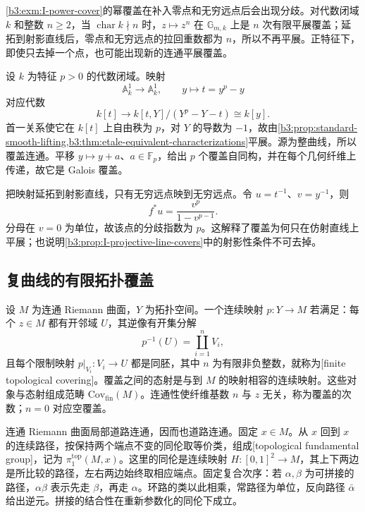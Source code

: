 \cref{b3:exm:I-power-cover}的幂覆盖在补入零点和无穷远点后会出现分歧。对代数闭域 \(k\) 和整数 \(n\ge2\)，当 \(\operatorname{char}k\nmid n\) 时，\(z\mapsto z^n\) 在 \(\mathbb G_{m,k}\) 上是 \(n\) 次有限平展覆盖；延拓到射影直线后，零点和无穷远点的拉回重数都为 \(n\)，所以不再平展。正特征下，即使只去掉一个点，也可能出现新的连通平展覆盖。

\begin{example}\label{b3:exm:I-affine-line-artin-schreier}
	设 \(k\) 为特征 \(p>0\) 的代数闭域。映射
	\[
		\mathbb A_k^1\longrightarrow\mathbb A_k^1,
		\qquad y\longmapsto t=y^p-y
	\]
	对应代数
	\[
		k[t]\longrightarrow k[t,Y]/(Y^p-Y-t)\cong k[y].
	\]
	首一关系使它在 \(k[t]\) 上自由秩为 \(p\)，对 \(Y\) 的导数为 \(-1\)，故由\cref{b3:prop:standard-smooth-lifting,b3:thm:etale-equivalent-characterizations}平展。源为整曲线，所以覆盖连通。平移 \(y\mapsto y+a\)、\(a\in\mathbb F_p\)，给出 \(p\) 个覆盖自同构，并在每个几何纤维上传递，故它是 Galois 覆盖。

	把映射延拓到射影直线，只有无穷远点映到无穷远点。令 \(u=t^{-1}\)、\(v=y^{-1}\)，则
	\[
		f^*u=\frac{v^p}{1-v^{p-1}}.
	\]
	分母在 \(v=0\) 为单位，故该点的分歧指数为 \(p\)。这解释了覆盖为何只在仿射直线上平展；也说明\cref{b3:prop:I-projective-line-covers}中的射影性条件不可去掉。
\end{example}

\subsection{复曲线的有限拓扑覆盖}
\label{b3:subsec:I03:02}

\begin{definition}\label{b3:def:I-topological-cover}
	设 \(M\) 为连通 Riemann 曲面，\(Y\) 为拓扑空间。一个连续映射 \(p:Y\rightarrow M\) 若满足：每个 \(z\in M\) 都有开邻域 \(U\)，其逆像有开集分解
	\[
		p^{-1}(U)=\coprod_{i=1}^n V_i,
	\]
	且每个限制映射 \(p|_{V_i}:V_i\rightarrow U\) 都是同胚，其中 \(n\) 为有限非负整数，就称为[finite topological covering]。覆盖之间的态射是与到 \(M\) 的映射相容的连续映射。这些对象与态射组成范畴 \(\mathrm{Cov}_{\mathrm{fin}}(M)\)。连通性使纤维基数 \(n\) 与 \(z\) 无关，称为覆盖的次数；\(n=0\) 对应空覆盖。
\end{definition}

连通 Riemann 曲面局部道路连通，因而也道路连通。固定 \(x\in M\)。从 \(x\) 回到 \(x\) 的连续路径，按保持两个端点不变的同伦取等价类，组成[topological fundamental group]，记为 \(\pi_1^{\mathrm{top}}(M,x)\)。这里的同伦是连续映射 \(H:[0,1]^2\rightarrow M\)，其上下两边是所比较的路径，左右两边始终取相应端点。固定复合次序：若 \(\alpha,\beta\) 为可拼接的路径，\(\alpha\beta\) 表示先走 \(\beta\)，再走 \(\alpha\)。环路的类以此相乘，常路径为单位，反向路径 \(\bar\alpha\) 给出逆元。拼接的结合性在重新参数化的同伦下成立。

